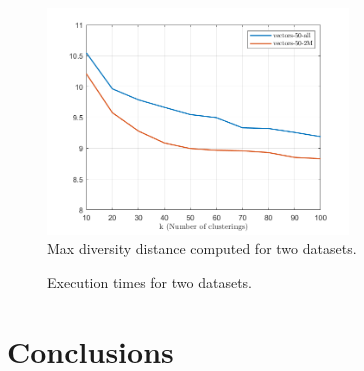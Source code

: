 \documentclass[10pt]{article}
\begin{document}
\begin{figure}[H]
	\centering
	\includegraphics[width=8cm]{maxdivdst}
	\caption{Max diversity distance computed for two datasets.}
\end{figure}

\begin{figure}[H]
	\centering
	\caption{Execution times for two datasets.}
\end{figure}

\section{Conclusions}
\end{document}
